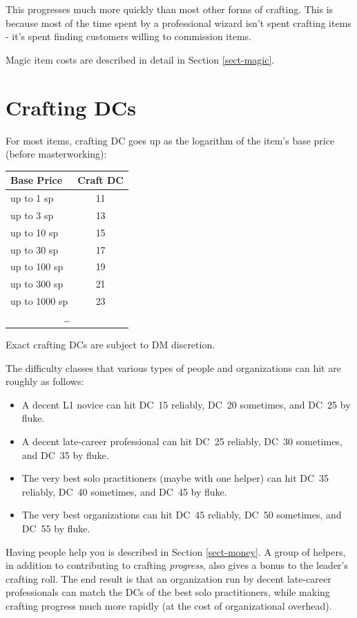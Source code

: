 This progresses much more quickly than most other forms of crafting. This
is because most of the time spent by a professional wizard isn't spent
crafting items - it's spent finding customers willing to commission items.


Magic item costs are described in detail in Section \ref{sect-magic}.
%

%
\section{Crafting DCs}

For most items, crafting DC goes up as the logarithm of the item's base
price (before masterworking):

\begin{tabular}{lc}\hline
\textbf{Base Price} & \textbf{Craft DC} \\ \hline
up to 1 sp & 11 \\
up to 3 sp & 13 \\
up to 10 sp & 15 \\
up to 30 sp & 17 \\
up to 100 sp & 19 \\
up to 300 sp & 21 \\
up to 1000 sp & 23 \\
\multicolumn{2}{c}{\ldots} \\ \hline
\end{tabular}

Exact crafting DCs are subject to DM discretion.

The difficulty classes that various types of people and organizations can
hit are roughly as follows:

\begin{itemize}
\item A decent L1 novice can hit DC~15 reliably, DC~20 sometimes, and DC~25
by fluke.
\item A decent late-career professional can hit DC~25 reliably, DC~30
sometimes, and DC~35 by fluke.
\item The very best solo practitioners (maybe with one helper) can hit DC~35
reliably, DC~40 sometimes, and DC~45 by fluke.
\item The very best organizations can hit DC~45 reliably, DC~50 sometimes,
and DC~55 by fluke.
\end{itemize}

Having people help you is described in Section \ref{sect-money}. A group
of helpers, in addition to contributing to crafting \textit{progress}, also
gives a bonus to the leader's crafting roll. The end result is that an
organization run by decent late-career professionals can match the DCs of
the best solo practitioners, while making crafting progress much more
rapidly (at the cost of organizational overhead).

%
